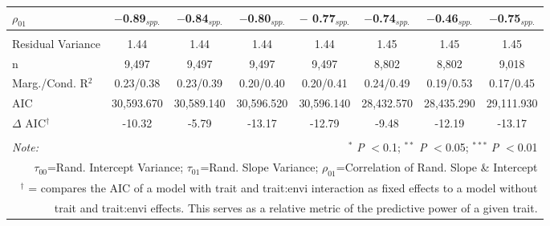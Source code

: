 \documentclass[12pt, letterpaper]{article}
\begin{document}
\begin{table}[h]
{\begin{tabular}{lccccccc}
  $\rho_{01}$ & $-$0.89$_{spp.}$ & $-$0.84$_{spp.}$ & $-$0.80$_{spp.}$ & $-$ 0.77$_{spp.}$ & $-$0.74$_{spp.}$ & $-$0.46$_{spp.}$ & $-$0.75$_{spp.}$ \\
\hline \\[-1.8ex] 
\rowcolor[gray]{.95} Residual Variance & 1.44 & 1.44 & 1.44 & 1.44 & 1.45 & 1.45 & 1.45 \\
n & 9,497 & 9,497 & 9,497 & 9,497 & 8,802 & 8,802 & 9,018 \\ 
\rowcolor[gray]{.95} Marg./Cond. R$^2$ & 0.23/0.38 & 0.23/0.39	& 0.20/0.40 & 0.20/0.41	& 0.24/0.49 & 0.19/0.53 & 0.17/0.45\\
AIC & 30,593.670 & 30,589.140 & 30,596.520 & 30,596.140 & 28,432.570 & 28,435.290 & 29,111.930 \\ 
\hline 
\rowcolor[gray]{.95}$\Delta$ AIC$^\dagger$  & -10.32 & -5.79 & -13.17 & -12.79 & -9.48 & -12.19  & -13.17 \\
\hline 
\hline \\[-1.8ex] 
\textit{Note:}  & \multicolumn{7}{r}{$^{*}$ \textit{P} $<$0.1; $^{**}$ \textit{P} $<$0.05; $^{***}$ \textit{P} $<$0.01}\\
\multicolumn{8}{r}{$\tau_{00}$=Rand. Intercept Variance; $\tau_{01}$=Rand. Slope Variance; $\rho_{01}$=Correlation of Rand. Slope \& Intercept}\\ 
\multicolumn{8}{r}{$^\dagger$ = compares the AIC of a model with trait and trait:envi interaction as fixed effects to a model without}\\
\multicolumn{8}{r}{trait and trait:envi effects. This serves as a relative metric of the predictive power of a given trait.}
\end{tabular}} 
\end{table} 
\end{document}
